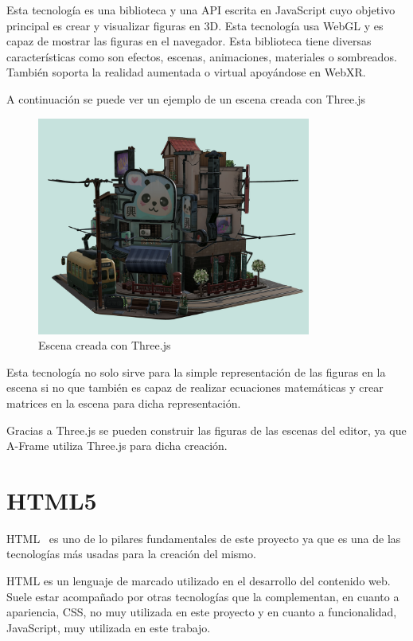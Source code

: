 \documentclass[a4paper, 12pt]{book}
\begin{document}
Esta tecnología es una biblioteca y una API escrita en JavaScript cuyo objetivo principal es crear y visualizar figuras en 3D. Esta tecnología usa WebGL y es capaz de mostrar las figuras en el navegador. Esta biblioteca tiene diversas características como son efectos, escenas, animaciones, materiales o sombreados. También soporta la realidad aumentada o virtual apoyándose en WebXR.

A continuación se puede ver un ejemplo de un escena creada con Three.js
\begin{figure}[H]
  \centering
  \includegraphics[width=9cm, keepaspectratio]{img/threejs.png}
  \caption{Escena creada con Three.js}\label{fig:three}
\end{figure}

Esta tecnología no solo sirve para la simple representación de las figuras en la escena si no que también es capaz de realizar ecuaciones matemáticas y crear matrices en la escena para dicha representación.

Gracias a Three.js se pueden construir las figuras de las escenas del editor, ya que A-Frame utiliza Three.js para dicha creación.

\section{HTML5} %
\label{sec:HTML5}
HTML~\cite{HTML} es uno de lo pilares fundamentales de este proyecto ya que es una de las tecnologías más usadas para la creación del mismo.

HTML es un lenguaje de marcado utilizado en el desarrollo del contenido web. Suele estar acompañado por otras tecnologías que la complementan, en cuanto a apariencia, CSS, no muy utilizada en este proyecto y en cuanto a funcionalidad, JavaScript, muy utilizada en este trabajo.
\end{document}
